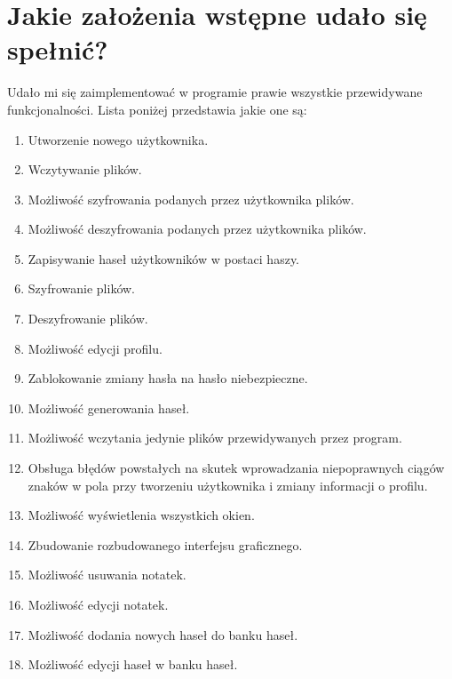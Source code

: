 \documentclass[a4paper]{article}
\begin{document}
\section{Jakie założenia wstępne udało się spełnić?}
Udało mi się zaimplementować w programie prawie wszystkie przewidywane funkcjonalności. Lista poniżej przedstawia jakie one są:
\begin{enumerate}
    \item Utworzenie nowego użytkownika.
    \item Wczytywanie plików.
    \item Możliwość szyfrowania podanych przez użytkownika plików.
    \item Możliwość deszyfrowania podanych przez użytkownika plików.
    \item Zapisywanie haseł użytkowników w postaci haszy.
    \item Szyfrowanie plików.
    \item Deszyfrowanie plików.
    \item Możliwość edycji profilu.
    \item Zablokowanie zmiany hasła na hasło niebezpieczne.
    \item Możliwość generowania haseł.
    \item Możliwość wczytania jedynie plików przewidywanych przez program.
    \item Obsługa błędów powstałych na skutek wprowadzania niepoprawnych ciągów znaków w pola przy tworzeniu użytkownika i zmiany informacji o profilu.
    \item Możliwość wyświetlenia wszystkich okien.
    \item Zbudowanie rozbudowanego interfejsu graficznego.
    \item Możliwość usuwania notatek.
    \item Możliwość edycji notatek.
    \item Możliwość dodania nowych haseł do banku haseł.
    \item Możliwość edycji haseł w banku haseł.
\end{enumerate}
\end{document}
